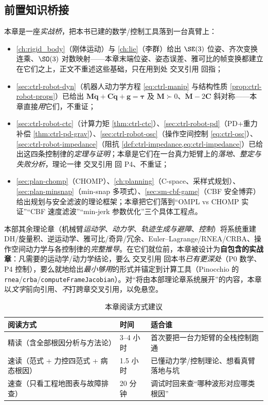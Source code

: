 \subsection*{前置知识桥接}
本章是一座\emph{实战桥}，把本书已建的数学/控制工具落到一台真臂上：
\begin{itemize}
  \item \cref{ch:rigid_body}（刚体运动）与 \cref{ch:lie}（李群）给出 $\SE(3)$ 位姿、齐次变换连乘、$\SO(3)$ 对数映射——本章末端位姿、姿态误差、雅可比的帧变换都建立在它们之上，正文不重述这些基础，只在用到处 交叉引用 回指；
  \item \cref{sec:ctrl-robot-dyn}（机器人动力学方程 \cref{eq:ctrl-manip} 与结构性质 \cref{prop:ctrl-robot-props}）已给出 $\mathbf{M}\ddot{\mathbf{q}}+\mathbf{C}\dot{\mathbf{q}}+\mathbf{g}=\boldsymbol{\tau}$ 及 $\mathbf{M}\succ0$、$\dot{\mathbf{M}}-2\mathbf{C}$ 斜对称——本章直接\emph{用}它们，不重证；
  \item \cref{sec:ctrl-robot-ctc}（计算力矩 \cref{thm:ctrl-ctc}）、\cref{sec:ctrl-robot-pd}（PD+重力补偿 \cref{thm:ctrl-pd-grav}）、\cref{sec:ctrl-robot-osc}（操作空间控制 \cref{eq:ctrl-osc}）、\cref{sec:ctrl-robot-impedance}（阻抗 \cref{def:ctrl-impedance,eq:ctrl-impedance}）已给出这四条控制律的\emph{定理与证明}；本章是它们在一台真力矩臂上的\emph{落地、整定与失败分析}，理论一律 交叉引用 回 P4、不重证；
  \item \cref{sec:plan-chomp}（CHOMP）、\cref{ch:planning}（C-space、采样式规划）、\cref{sec:plan-minsnap}（min-snap 多项式）、\cref{sec:sm-cbf-game}（CBF 安全博弈）给出规划与安全滤波的理论框架；本章把它们落到“OMPL vs CHOMP 实证”“CBF 速度滤波”“min-jerk 参数优化”三个具体工程点。
\end{itemize}

\begin{note}\label{note:ap-selfcontained}
本部其余理论章（机械臂\emph{运动学}、\emph{动力学}、\emph{轨迹生成与避障}、\emph{控制}）将系统重建 DH/旋量积、逆运动学、雅可比/奇异/冗余、Euler--Lagrange/RNEA/CRBA、操作空间动力学与各控制律的\emph{完整推导}。在它们就位前，本章被设计为\textbf{自包含的实战章}：凡需要的运动学/动力学结论，要么 交叉引用 回本书\emph{已有更深处}（P0 数学、P4 控制），要么就地给出\emph{最小够用}的形式并锚定到计算工具（Pinocchio 的 \texttt{rnea}/\allowbreak\texttt{crba}/\allowbreak\texttt{computeFrameJacobian}）。对“将由本部理论章系统展开”的内容，本章以\emph{文字}前向引用、\emph{不}打跨章交叉引用，以免悬空。
\end{note}

\begin{table}[H]\centering\small
\caption{本章阅读方式建议}
\begin{tabular}{lll}
\toprule
阅读方式 & 时间 & 适合谁 \\
\midrule
精读（含全部根因分析与方法论） & 3--4 小时 & 首次要把一台力矩臂的全栈控制跑通 \\
速读（范式 + 力控四范式 + 病态根因） & 1.5 小时 & 已懂动力学/控制理论、想看真臂落地与坑 \\
速查（只看工程地图表与故障排查） & 20 分钟 & 调试时回来查“哪种波形对应哪类根因” \\
\bottomrule
\end{tabular}
\end{table}

